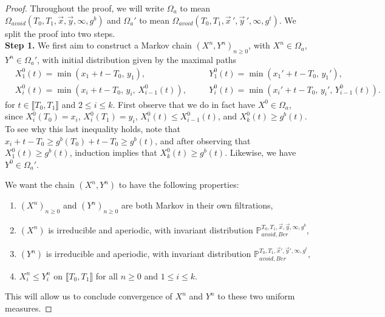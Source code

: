 \begin{proof} Throughout the proof, we will write $\Omega_a$ to mean $\Omega_{avoid}(T_0,T_1,\vec{x},\vec{y},\infty,g^b)$ and $\Omega_a'$ to mean $\Omega_{avoid}(T_0,T_1,\vec{x}\,',\vec{y}\,',\infty,g^t)$. We split the proof into two steps.\\
	
	\noindent\textbf{Step 1.} We first aim to construct a Markov chain $(X^n,Y^n)_{n\geq 0}$, with $X^n\in \Omega_a$, $Y^n\in \Omega_a'$, with initial distribution given by the maximal paths
	\begin{align*}
	& X^0_1(t) = \min(x_1+t-T_0, \, y_1), && Y^0_1(t) = \min(x_1'+t-T_0, \, y_1'),\\
	& X^0_i(t) = \min(x_i+t-T_0, \,y_i, \, X^0_{i-1}(t)), \quad && Y^0_i(t) = \min(x_i'+t-T_0, \, y_i', \, Y^0_{i-1}(t)).
	\end{align*}
	for $t\in\llbracket T_0, T_1\rrbracket$ and $2\leq i\leq k$. First observe that we do in fact have $X^0 \in \Omega_a$, since $X_i^0(T_0) = x_i$, $X_i^0(T_1) = y_i$, $X_i^0(t) \leq X_{i-1}^0(t)$, and $X_k^0(t) \geq g^b(t)$. To see why this last inequality holds, note that $x_i + t - T_0 \geq g^b(T_0) + t - T_0 \geq g^b(t)$, and after observing that $X_1^0(t) \geq g^b(t)$, induction implies that $X_k^0(t) \geq g^b(t)$. Likewise, we have $Y^0 \in \Omega_a'$. 
	
	We want the chain $(X^n,Y^n)$ to have the following properties: 
	\begin{enumerate}[label=(\arabic*)]
		
		\item $(X^n)_{n\geq 0}$ and $(Y^n)_{n\geq 0}$ are both Markov in their own filtrations,
		
		\item $(X^n)$ is irreducible and aperiodic, with invariant distribution $\mathbb{P}_{avoid,Ber}^{T_0,T_1,\vec{x},\vec{y},\infty,g^b}$,
		
		\item $(Y^n)$ is irreducible and aperiodic, with invariant distribution $\mathbb{P}_{avoid,Ber}^{T_0,T_1,\vec{x}',\vec{y}',\infty,g^t}$,
		
		\item $X^n_i\leq Y^n_i$ on $\llbracket T_0, T_1\rrbracket$ for all $n\geq 0$ and $1\leq i \leq k$.
		
	\end{enumerate}
	
	\noindent This will allow us to conclude convergence of $X^n$ and $Y^n$ to these two uniform measures.
	

\end{proof}

